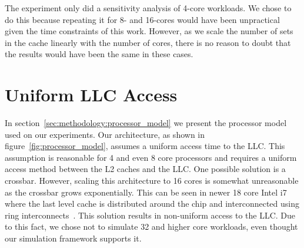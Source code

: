 The experiment only did a sensitivity analysis of 4-core workloads. 
We chose to do this because repeating it for 8- and 16-cores would have been unpractical given the time constraints of this work. 
However, as we scale the number of sets in the cache linearly with the number of cores, there is no reason to doubt that the results would have been the same in these cases.


\section{Uniform LLC Access}

In section~\ref{sec:methodology:processor_model} we present the processor model used on our experiments.
Our architecture, as shown in figure~\ref{fig:processor_model}, assumes a uniform access time to the LLC.
This assumption is reasonable for 4 and even 8 core processors and requires a uniform access method between the L2 caches and the LLC.
One possible solution is a crossbar.
However, scaling this architecture to 16 cores is somewhat unreasonable as the crossbar grows exponentially.
This can be seen in newer 18 core Intel i7 where the last level cache is distributed around the chip and interconnected using ring interconnects~\cite{Hruska2014}.
This solution results in non-uniform access to the LLC.
Due to this fact, we chose not to simulate 32 and higher core workloads, even thought our simulation framework supports it.

